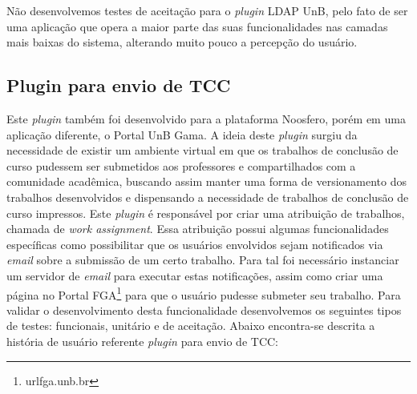 Não desenvolvemos testes de aceitação para o \textit{plugin} LDAP UnB, pelo fato de ser uma aplicação que opera a maior parte das suas funcionalidades nas camadas mais baixas do sistema, alterando muito pouco a percepção do usuário.

\subsection{Plugin para envio de TCC}

Este \textit{plugin} também foi desenvolvido para a plataforma Noosfero, porém em uma aplicação diferente, o Portal UnB Gama. A ideia deste \textit{plugin} surgiu da necessidade de existir um ambiente virtual em que os trabalhos de conclusão de curso pudessem ser submetidos aos professores e compartilhados com a comunidade acadêmica, buscando assim manter uma forma de versionamento dos trabalhos desenvolvidos e dispensando a necessidade de trabalhos de conclusão de curso impressos.
%
Este \textit{plugin} é responsável por criar uma atribuição de trabalhos, chamada de \textit{work assignment}. Essa atribuição possui algumas funcionalidades específicas como possibilitar que os usuários envolvidos sejam notificados via \textit{email} sobre a submissão de um certo trabalho. Para tal foi necessário instanciar um servidor de \textit{email} para executar estas notificações, assim como criar uma página no Portal FGA\footnote{url{fga.unb.br}} para que o usuário pudesse submeter seu trabalho.
%
Para validar o desenvolvimento desta funcionalidade desenvolvemos os seguintes tipos de testes: funcionais, unitário e de aceitação. Abaixo encontra-se descrita a história de usuário referente \textit{plugin} para envio de TCC:
